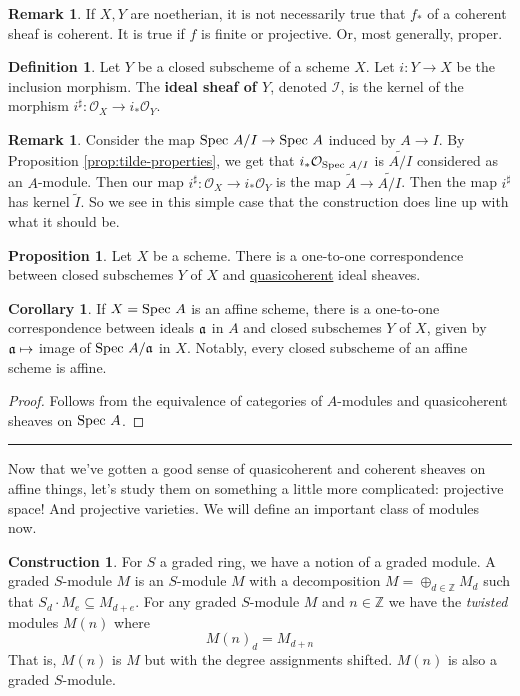 \documentclass[10pt,reqno]{amsart}
\theoremstyle{definition}
\newtheorem{corollary}[theorem]{Corollary}
\newtheorem{definition}[theorem]{Definition}
\newtheorem{proposition}[theorem]{Proposition}
\newtheorem{construction}[theorem]{Construction}
\newtheorem{remark}[theorem]{Remark}
\theoremstyle{remark}
\numberwithin{equation}{section}
\numberwithin{theorem}{section}
\newcommand{\Z}{{\mathbb Z}}
\newcommand{\OO}{{\mathcal O}}
\newcommand{\spec}{\textup{Spec }}
\newcommand{\fraka}{\frak{a}}
\newcommand{\II}{{\mathscr I}}
\newcommand{\wt}{\widetilde}
\begin{document}
\begin{remark} If $X,Y$ are noetherian, it is not necessarily true that $f_*$ of a coherent sheaf is coherent. It is true if $f$ is finite or projective. Or, most generally, proper.
\end{remark}

\begin{definition} Let $Y$ be a closed subscheme of a scheme $X$. Let $i: Y \to X$ be the inclusion morphism. The \textbf{ideal sheaf of $Y$}, denoted $\II$, is the kernel of the morphism $i^{\sharp}: \OO_X \to i_* \OO_Y$.
\end{definition}

\begin{remark}
Consider the map $\spec A/I \to \spec A$ induced by $A \to I$. By Proposition \ref{prop:tilde-properties}, we get that $i_* \OO_{\spec A/I}$ is $\wt{A/I}$ considered as an $A$-module. Then our map $i^{\sharp}: \OO_X \to i_* \OO_Y$ is the map $\wt{A} \to \wt{A/I}$. Then the map $i^{\sharp}$ has kernel $\wt{I}$. So we see in this simple case that the construction does line up with what it should be.
\end{remark}

\begin{proposition} Let $X$ be a scheme. There is a one-to-one correspondence between closed subschemes $Y$ of $X$ and \underline{quasicoherent} ideal sheaves.
\end{proposition}

\begin{corollary} If $X = \spec A$ is an affine scheme, there is a one-to-one correspondence between ideals $\fraka$ in $A$ and closed subschemes $Y$ of $X$, given by $\fraka \mapsto$ image of $\spec A/\fraka$ in $X$. Notably, every closed subscheme of an affine scheme is affine.
\end{corollary}
\begin{proof}
Follows from the equivalence of categories of $A$-modules and quasicoherent sheaves on $\spec A$.
\end{proof}

\hrule
\vspace{1em}

Now that we've gotten a good sense of quasicoherent and coherent sheaves on affine things, let's study them on something a little more complicated: projective space! And projective varieties. We will define an important class of modules now.

\begin{construction}
For $S$ a graded ring, we have a notion of a graded module. A graded $S$-module $M$ is an $S$-module $M$ with a decomposition $M = \oplus_{d \in \Z} M_d$ such that $S_d \cdot M_e \subseteq M_{d+e}$. For any graded $S$-module $M$ and $n \in \Z$ we have the  \textit{twisted} modules $M(n)$ where
\[M(n)_d = M_{d+n}\] 
That is, $M(n)$ is $M$ but with the degree assignments shifted. $M(n)$ is also a graded $S$-module.
\end{construction}
\end{document}
